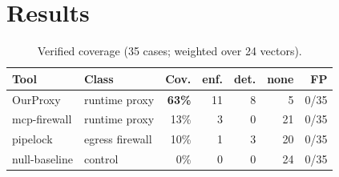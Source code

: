 \documentclass[sigconf,review,anonymous]{acmart}
\begin{document}
\section{Results}\label{sec:results}
\begin{table}[t]
\caption{Verified coverage (35 cases; weighted over 24 vectors).}
\label{tab:results}
\small
\begin{tabular}{llrrrrr}
\toprule
Tool & Class & Cov. & enf. & det. & none & FP \\
\midrule
OurProxy & runtime proxy & \textbf{63\%} & 11 & 8 & 5 & 0/35 \\
mcp-firewall & runtime proxy & 13\% & 3 & 0 & 21 & 0/35 \\
pipelock & egress firewall & 10\% & 1 & 3 & 20 & 0/35 \\
null-baseline & control & 0\% & 0 & 0 & 24 & 0/35 \\
\bottomrule
\end{tabular}
\end{table}
\end{document}
